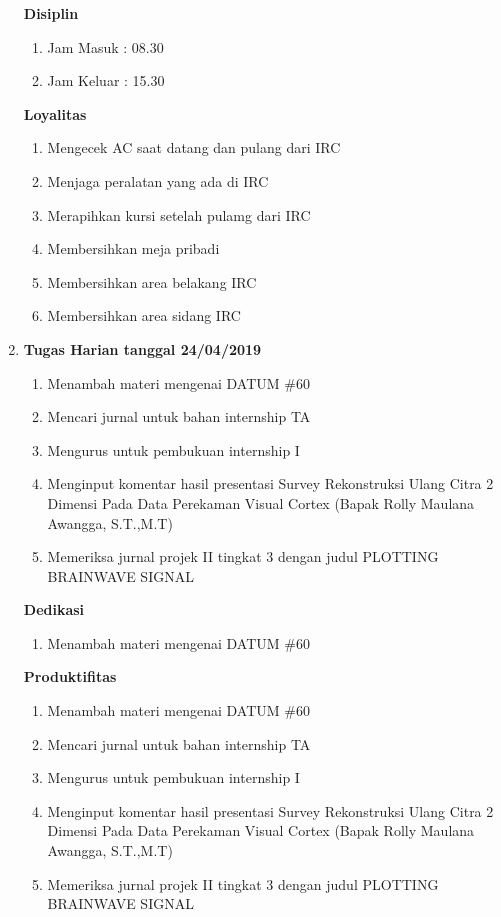 \begin{enumerate}
\textbf{Disiplin}
\begin{enumerate}
\item Jam Masuk : 08.30
\item Jam Keluar : 15.30
\end{enumerate}

\textbf{Loyalitas}
\begin{enumerate}
\item Mengecek AC saat datang dan pulang dari IRC
\item Menjaga peralatan yang ada di IRC
\item Merapihkan kursi setelah pulamg dari IRC
\item Membersihkan meja pribadi
\item Membersihkan area belakang IRC
\item Membersihkan area sidang IRC
\end{enumerate}


\item \textbf{Tugas Harian tanggal 24/04/2019}
\begin{enumerate}
\item Menambah materi mengenai DATUM \#60
\item Mencari jurnal untuk bahan internship TA
\item Mengurus untuk pembukuan internship I 
\item Menginput komentar hasil presentasi Survey Rekonstruksi Ulang Citra 2 Dimensi Pada Data Perekaman Visual Cortex (Bapak Rolly Maulana Awangga, S.T.,M.T)
\item Memeriksa jurnal projek II tingkat 3 dengan judul PLOTTING BRAINWAVE SIGNAL
\end{enumerate}

\textbf{Dedikasi}
\begin{enumerate}
\item Menambah materi mengenai DATUM \#60
\end{enumerate}

\textbf{Produktifitas}
\begin{enumerate}
\item Menambah materi mengenai DATUM \#60
\item Mencari jurnal untuk bahan internship TA
\item Mengurus untuk pembukuan internship I 
\item Menginput komentar hasil presentasi Survey Rekonstruksi Ulang Citra 2 Dimensi Pada Data Perekaman Visual Cortex (Bapak Rolly Maulana Awangga, S.T.,M.T)
\item Memeriksa jurnal projek II tingkat 3 dengan judul PLOTTING BRAINWAVE SIGNAL
\end{enumerate}


\end{enumerate}
